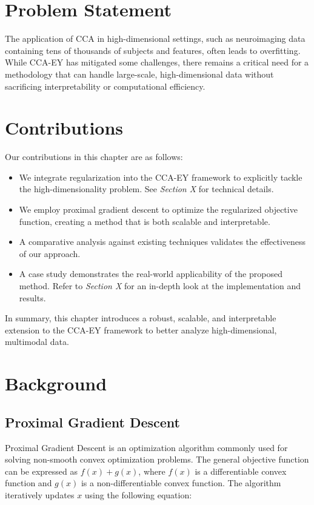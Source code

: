 \section{Problem Statement}

The application of CCA in high-dimensional settings, such as neuroimaging data containing tens of thousands of subjects and features, often leads to overfitting.
While CCA-EY has mitigated some challenges, there remains a critical need for a methodology that can handle large-scale, high-dimensional data without sacrificing interpretability or computational efficiency.

\section{Contributions}

Our contributions in this chapter are as follows:

\begin{itemize}
    \item We integrate regularization into the CCA-EY framework to explicitly tackle the high-dimensionality problem. See \textit{Section X} for technical details.
    \item We employ proximal gradient descent to optimize the regularized objective function, creating a method that is both scalable and interpretable.
    \item A comparative analysis against existing techniques validates the effectiveness of our approach.
    \item A case study demonstrates the real-world applicability of the proposed method. Refer to \textit{Section X} for an in-depth look at the implementation and results.
\end{itemize}

In summary, this chapter introduces a robust, scalable, and interpretable extension to the CCA-EY framework to better analyze high-dimensional, multimodal data.

\section{Background}

\subsection{Proximal Gradient Descent}

Proximal Gradient Descent is an optimization algorithm commonly used for solving non-smooth convex optimization problems.
The general objective function can be expressed as \( f(x) + g(x) \), where \( f(x) \) is a differentiable convex function and \( g(x) \) is a non-differentiable convex function.
The algorithm iteratively updates \( x \) using the following equation:

